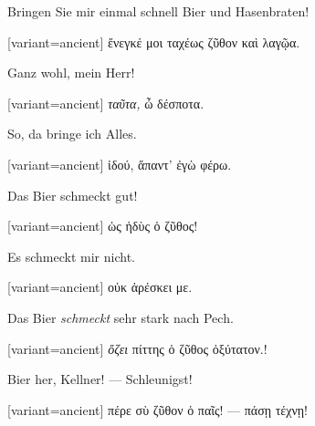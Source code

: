 Bringen Sie mir einmal schnell Bier und Hasenbraten!

\switchcolumn

\begin{greek}[variant=ancient]%
ἔνεγκέ μοι ταχέως ζῦθον καὶ λαγῷα.

\end{greek}%
\switchcolumn*

Ganz wohl, mein Herr!

\switchcolumn

\begin{greek}[variant=ancient]%
\emph{ταῦτα,} ὦ δέσποτα.

\end{greek}%
\switchcolumn*

So, da bringe ich Alles.

\switchcolumn

\begin{greek}[variant=ancient]%
ἰδού, ἅπαντ' ἐγὼ φέρω.

\end{greek}%
\switchcolumn*

Das Bier schmeckt gut!

\switchcolumn

\begin{greek}[variant=ancient]%
ὡς ἡδὺς ὁ ζῦθος!

\end{greek}%
\switchcolumn*

Es schmeckt mir nicht.

\switchcolumn

\begin{greek}[variant=ancient]%
οὐκ ἀρέσκει με.

\end{greek}%
\switchcolumn*

Das Bier \emph{schmeckt} sehr stark nach Pech.

\switchcolumn

\begin{greek}[variant=ancient]%
\emph{ὄζει} πίττης ὁ ζῦθος ὀξύτατον.!

\end{greek}%
\switchcolumn*

Bier her, Kellner! --- Schleunigst!

\switchcolumn

\begin{greek}[variant=ancient]%
πέρε σὺ ζῦθον ὁ παῖς! --- πάσῃ τέχνῃ!

\end{greek}%
\switchcolumn*

